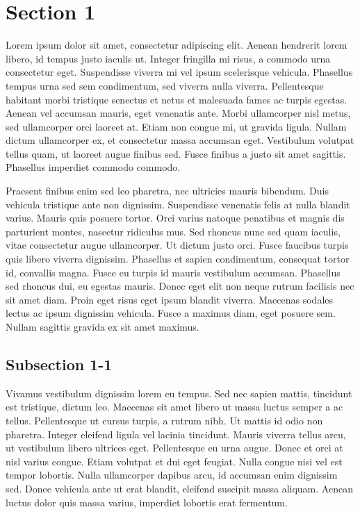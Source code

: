\section{Section 1}
  Lorem ipsum dolor sit amet, consectetur adipiscing elit. Aenean hendrerit lorem libero, id tempus justo iaculis ut. Integer fringilla mi risus, a commodo urna consectetur eget. Suspendisse viverra mi vel ipsum scelerisque vehicula. Phasellus tempus urna sed sem condimentum, sed viverra nulla viverra. Pellentesque habitant morbi tristique senectus et netus et malesuada fames ac turpis egestas. Aenean vel accumsan mauris, eget venenatis ante. Morbi ullamcorper nisl metus, sed ullamcorper orci laoreet at. Etiam non congue mi, ut gravida ligula. Nullam dictum ullamcorper ex, et consectetur massa accumsan eget. Vestibulum volutpat tellus quam, ut laoreet augue finibus sed. Fusce finibus a justo sit amet sagittis. Phasellus imperdiet commodo commodo.

  Praesent finibus enim sed leo pharetra, nec ultricies mauris bibendum. Duis vehicula tristique ante non dignissim. Suspendisse venenatis felis at nulla blandit varius. Mauris quis posuere tortor. Orci varius natoque penatibus et magnis dis parturient montes, nascetur ridiculus mus. Sed rhoncus nunc sed quam iaculis, vitae consectetur augue ullamcorper. Ut dictum justo orci. Fusce faucibus turpis quis libero viverra dignissim. Phasellus et sapien condimentum, consequat tortor id, convallis magna. Fusce eu turpis id mauris vestibulum accumsan. Phasellus sed rhoncus dui, eu egestas mauris. Donec eget elit non neque rutrum facilisis nec sit amet diam. Proin eget risus eget ipsum blandit viverra. Maecenas sodales lectus ac ipsum dignissim vehicula. Fusce a maximus diam, eget posuere sem. Nullam sagittis gravida ex sit amet maximus.

  \subsection{Subsection 1-1}
    Vivamus vestibulum dignissim lorem eu tempus. Sed nec sapien mattis, tincidunt est tristique, dictum leo. Maecenas sit amet libero ut massa luctus semper a ac tellus. Pellentesque ut cursus turpis, a rutrum nibh. Ut mattis id odio non pharetra. Integer eleifend ligula vel lacinia tincidunt. Mauris viverra tellus arcu, ut vestibulum libero ultrices eget. Pellentesque eu urna augue. Donec et orci at nisl varius congue. Etiam volutpat et dui eget feugiat. Nulla congue nisi vel est tempor lobortis. Nulla ullamcorper dapibus arcu, id accumsan enim dignissim sed. Donec vehicula ante ut erat blandit, eleifend suscipit massa aliquam. Aenean luctus dolor quis massa varius, imperdiet lobortis erat fermentum.

